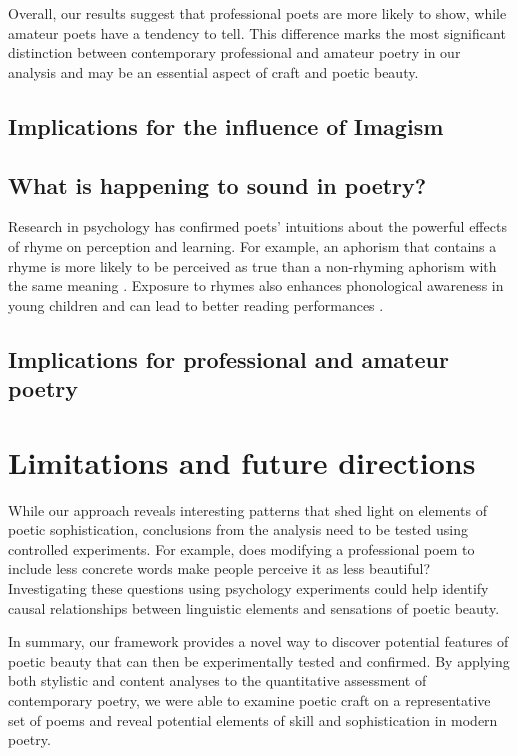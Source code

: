 \documentclass{book}
\begin{document}
Overall, our results suggest that professional poets are more likely to show, while amateur poets have a tendency to tell. This difference marks the most significant distinction between contemporary professional and amateur poetry in our analysis and may be an essential aspect of craft and poetic beauty.

\subsection{Implications for the influence of Imagism}



\subsection{What is happening to sound in poetry?}

Research in psychology has confirmed poets' intuitions about the powerful effects of rhyme on perception and learning. For example, an aphorism that contains a rhyme is more likely to be perceived as true than a non-rhyming aphorism with the same meaning \citep{aphorisms}. Exposure to rhymes also enhances phonological awareness in young children and can lead to better reading performances \citep{reading}.

\subsection{Implications for professional and amateur poetry}



\section{Limitations and future directions}

While our approach reveals interesting patterns that shed light on elements of poetic sophistication, conclusions from the analysis need to be tested using controlled experiments. For example, does modifying a professional poem to include less concrete words make people perceive it as less beautiful? Investigating these questions using psychology experiments could help identify causal relationships between linguistic elements and sensations of poetic beauty.

In summary, our framework provides a novel way to discover potential features of poetic beauty that can then be experimentally tested and confirmed. By applying both stylistic and content analyses to the quantitative assessment of contemporary poetry, we were able to examine poetic craft on a representative set of poems and reveal potential elements of skill and sophistication in modern poetry.
\end{document}
